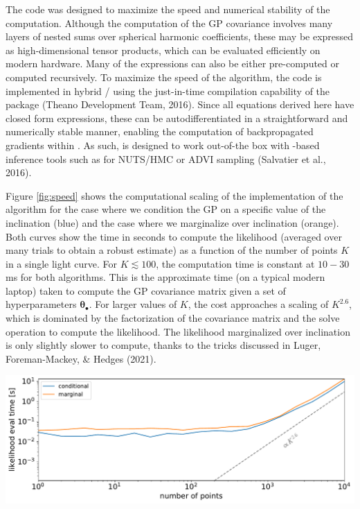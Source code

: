 \documentclass[10pt,a4paper,onecolumn]{article}
\let\origfigure\figure
\let\endorigfigure\endfigure
\renewenvironment{figure}[1][2] {
    \expandafter\origfigure\expandafter[H]
} {
    \endorigfigure
}
\let\textttOrig=\texttt
\def\texttt#1{\expandafter\textttOrig{\seqsplit{#1}}}
\begin{document}
The code was designed to maximize the speed and numerical stability of
the computation. Although the computation of the GP covariance involves
many layers of nested sums over spherical harmonic coefficients, these
may be expressed as high-dimensional tensor products, which can be
evaluated efficiently on modern hardware. Many of the expressions can
also be either pre-computed or computed recursively. To maximize the
speed of the algorithm, the code is implemented in hybrid
\texttt{C++}/\texttt{Python} using the just-in-time compilation
capability of the \texttt{Theano} package (Theano Development Team,
2016). Since all equations derived here have closed form expressions,
these can be autodifferentiated in a straightforward and numerically
stable manner, enabling the computation of backpropagated gradients
within \texttt{Theano}. As such, \texttt{starry\_process} is designed to
work out-of-the box with \texttt{Theano}-based inference tools such as
\texttt{PyMC3} for NUTS/HMC or ADVI sampling (Salvatier et al., 2016).

Figure \ref{fig:speed} shows the computational scaling of the
\texttt{Python} implementation of the algorithm for the case where we
condition the GP on a specific value of the inclination (blue) and the
case where we marginalize over inclination (orange). Both curves show
the time in seconds to compute the likelihood (averaged over many trials
to obtain a robust estimate) as a function of the number of points \(K\)
in a single light curve. For \(K \lesssim 100\), the computation time is
constant at \(10-30\) ms for both algorithms. This is the approximate
time (on a typical modern laptop) taken to compute the GP covariance
matrix given a set of hyperparameters \(\pmb{\theta}_\bullet\). For
larger values of \(K\), the cost approaches a scaling of \(K^{2.6}\),
which is dominated by the factorization of the covariance matrix and the
solve operation to compute the likelihood. The likelihood marginalized
over inclination is only slightly slower to compute, thanks to the
tricks discussed in Luger, Foreman-Mackey, \& Hedges (2021).

\begin{figure}
\centering
\includegraphics{figures/speed.pdf}
\caption{Evaluation time in seconds for a single log-likelihood
computation as a function of the number of points \(K\) in each light
curve when conditioning on a value of the inclination (blue) and when
marginalizing over the inclination (orange). At \(l_\mathrm{max} = 15\),
computation of the covariance matrix of the GP takes about 20ms on a
typical laptop. The dashed line shows the asymptotic scaling of the
algorithm, which is due to the Cholesky factorization and solve
operations.\label{fig:speed}}
\end{figure}
\end{document}
